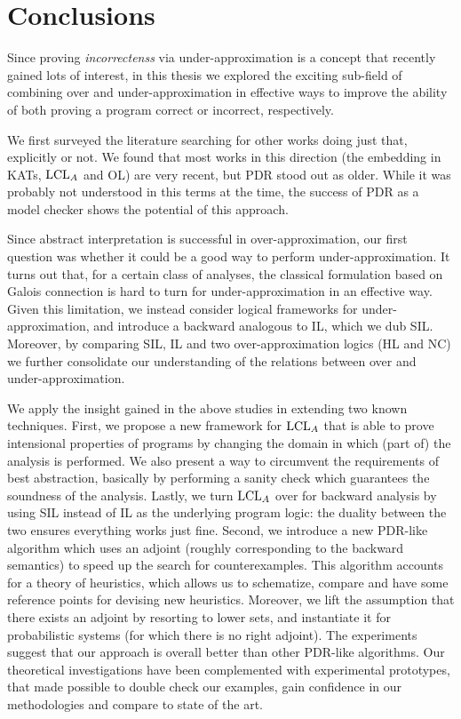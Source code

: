 
\chapter{Conclusions}\label{ch:conclusions}
Since proving \emph{incorrectenss} via under-approximation is a concept that recently gained lots of interest, in this thesis we explored the exciting sub-field of combining over and under-approximation in effective ways to improve the ability of both proving a program correct or incorrect, respectively.

We first surveyed the literature searching for other works doing just that, explicitly or not. We found that most works in this direction (the embedding in KATs, $\text{LCL}_A$ and OL) are very recent, but PDR stood out as older. While it was probably not understood in this terms at the time, the success of PDR as a model checker shows the potential of this approach.

Since abstract interpretation is successful in over-approximation, our first question was whether it could be a good way to perform under-approximation. It turns out that, for a certain class of analyses, the classical formulation based on Galois connection is hard to turn for under-approximation in an effective way. Given this limitation, we instead consider logical frameworks for under-approximation, and introduce a backward analogous to IL, which we dub SIL. Moreover, by comparing SIL, IL and two over-approximation logics (HL and NC) we further consolidate our understanding of the relations between over and under-approximation.

We apply the insight gained in the above studies in extending two known techniques.
First, we propose a new framework for $\text{LCL}_A$ that is able to prove intensional properties of programs by changing the domain in which (part of) the analysis is performed. We also present a way to circumvent the requirements of best abstraction, basically by performing a sanity check which guarantees the soundness of the analysis. Lastly, we turn $\text{LCL}_A$ over for backward analysis by using SIL instead of IL as the underlying program logic: the duality between the two ensures everything works just fine.
Second, we introduce a new PDR-like algorithm which uses an adjoint (roughly corresponding to the backward semantics) to speed up the search for counterexamples. This algorithm accounts for a theory of heuristics, which allows us to schematize, compare and have some reference points for devising new heuristics. Moreover, we lift the assumption that there exists an adjoint by resorting to lower sets, and instantiate it for probabilistic systems (for which there is no right adjoint). The experiments suggest that our approach is overall better than other PDR-like algorithms.
Our theoretical investigations have been complemented with experimental prototypes, that made possible to double check our examples, gain confidence in our methodologies and compare to state of the art.

